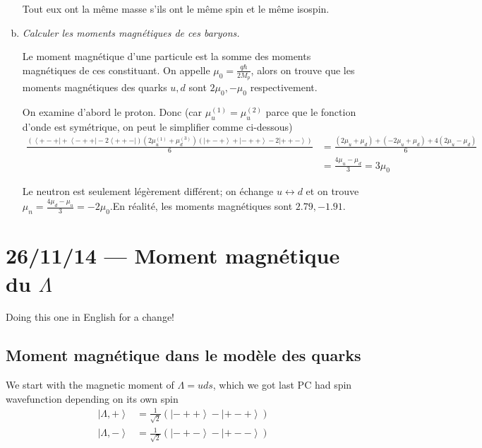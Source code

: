 \documentclass[10pt]{report}
\newcommand{\bra}[1]{\left<#1\right|}
\newcommand{\ket}[1]{\left|#1\right>}
\begin{document}
\begin{enumerate}[a)]
        Tout eux ont la m\^eme masse s'ils ont le m\^eme spin et le m\^eme isospin.
        
    \item \emph{Calculer les moments magn\'etiques de ces baryons.}

        Le moment magn\'etique d'une particule est la somme des moments magn\'etiques de ces constituant. On appelle $\mu_0 = \frac{q\hbar}{2M_p}$, alors on trouve que les moments magn\'etiques des quarks $u,d$ sont $2\mu_0, -\mu_0$ respectivement.

        On examine d'abord le proton. Donc (car $\mu_u^{(1)} = \mu_u^{(2)}$ parce que le fonction d'onde est sym\'etrique, on peut le simplifier comme ci-dessous)
        \begin{align}
            \tfrac{\left(\bra{+ - +} + \bra{- + +} - 2\bra{+ + -}\right) \left( 2\mu_u^{(1)} + \mu_d^{(3)} \right) \left(\ket{+ - +} + \ket{- + +} - 2\ket{+ + -}\right)}{6} &= \frac{\left( 2\mu_u + \mu_d \right) + \left( -2\mu_u + \mu_d \right) + 4\left( 2\mu_u - \mu_d \right)}{6}\\
            &= \frac{4\mu_u - \mu_d}{3} = 3\mu_0
        \end{align}

        Le neutron est seulement l\'eg\`erement diff\'erent; on \'echange $u \leftrightarrow d$ et on trouve $\mu_n = \frac{4\mu_d - \mu_u}{3}= -2\mu_0$.En r\'ealit\'e, les moments magn\'etiques sont $2.79, -1.91$.
\end{enumerate}

\chapter{26/11/14 --- Moment magn\'etique du $\Lambda$}

Doing this one in English for a change!

\section{Moment magn\'etique dans le mod\`ele des quarks}

We start with the magnetic moment of $\Lambda = uds$, which we got last PC had spin wavefunction depending on its own spin
\begin{align}
    \ket{\Lambda,+} &= \frac{1}{\sqrt{2}}\left( \ket{- + +} - \ket{+ - +} \right)\\
    \ket{\Lambda,-} &= \frac{1}{\sqrt{2}}\left( \ket{- + -} - \ket{+ - -} \right)
\end{align}
\end{document}
